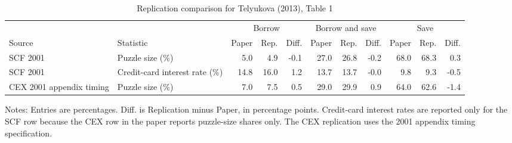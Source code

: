 
\begin{table}[!htbp]
\centering
\begin{threeparttable}
\caption{Replication comparison for Telyukova (2013), Table 1}
\label{tab:telyukova_table1_replication_comparison}
\begingroup
\small
\setlength{\tabcolsep}{3pt}
\begin{tabular}{llrrrrrrrrr}
\toprule
 & & \multicolumn{3}{c}{Borrow} & \multicolumn{3}{c}{Borrow and save} & \multicolumn{3}{c}{Save} \\
\cmidrule(lr){3-5} \cmidrule(lr){6-8} \cmidrule(lr){9-11}
Source & Statistic & Paper & Rep. & Diff. & Paper & Rep. & Diff. & Paper & Rep. & Diff. \\
\midrule
SCF 2001 & Puzzle size (\%) & 5.0 & 4.9 & -0.1 & 27.0 & 26.8 & -0.2 & 68.0 & 68.3 & 0.3 \\
SCF 2001 & Credit-card interest rate (\%) & 14.8 & 16.0 & 1.2 & 13.7 & 13.7 & -0.0 & 9.8 & 9.3 & -0.5 \\
CEX 2001 appendix timing & Puzzle size (\%) & 7.0 & 7.5 & 0.5 & 29.0 & 29.9 & 0.9 & 64.0 & 62.6 & -1.4 \\
\bottomrule
\end{tabular}
\endgroup
\begin{tablenotes}[flushleft]
\footnotesize
\item Notes: Entries are percentages. Diff. is Replication minus Paper, in percentage points. Credit-card interest rates are reported only for the SCF row because the CEX row in the paper reports puzzle-size shares only. The CEX replication uses the 2001 appendix timing specification.
\end{tablenotes}
\end{threeparttable}
\end{table}

